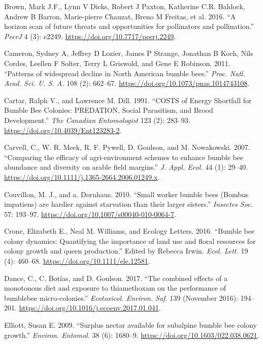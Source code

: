 \documentclass[11pt,]{article}
\begin{document}
\leavevmode\hypertarget{ref-Brown2016a}{}%
Brown, Mark J.F., Lynn V Dicks, Robert J Paxton, Katherine C.R. Baldock,
Andrew B Barron, Marie-pierre Chauzat, Breno M Freitas, et al. 2016. ``A
horizon scan of future threats and opportunities for pollinators and
pollination.'' \emph{PeerJ} 4 (3): e2249.
\url{https://doi.org/10.7717/peerj.2249}.

\leavevmode\hypertarget{ref-Cameron2011}{}%
Cameron, Sydney A, Jeffrey D Lozier, James P Strange, Jonathan B Koch,
Nils Cordes, Leellen F Solter, Terry L Griswold, and Gene E Robinson.
2011. ``Patterns of widespread decline in North American bumble bees.''
\emph{Proc. Natl. Acad. Sci. U. S. A.} 108 (2): 662--67.
\url{https://doi.org/10.1073/pnas.1014743108}.

\leavevmode\hypertarget{ref-Cartar1991}{}%
Cartar, Ralph V., and Lawrence M. Dill. 1991. ``COSTS of Energy
Shortfall for Bumble Bee Colonies: PREDATION, Social Parasitism, and
Brood Development.'' \emph{The Canadian Entomologist} 123 (2): 283--93.
\url{https://doi.org/10.4039/Ent123283-2}.

\leavevmode\hypertarget{ref-Carvell2007}{}%
Carvell, C., W. R. Meek, R. F. Pywell, D. Goulson, and M. Nowakowski.
2007. ``Comparing the efficacy of agri-environment schemes to enhance
bumble bee abundance and diversity on arable field margins.'' \emph{J.
Appl. Ecol.} 44 (1): 29--40.
\url{https://doi.org/10.1111/j.1365-2664.2006.01249.x}.

\leavevmode\hypertarget{ref-Couvillon2010}{}%
Couvillon, M. J., and a. Dornhaus. 2010. ``Small worker bumble bees
(Bombus impatiens) are hardier against starvation than their larger
sisters.'' \emph{Insectes Soc.} 57: 193--97.
\url{https://doi.org/10.1007/s00040-010-0064-7}.

\leavevmode\hypertarget{ref-Crone2016}{}%
Crone, Elizabeth E., Neal M. Williams, and Ecology Letters. 2016.
``Bumble bee colony dynamics: Quantifying the importance of land use and
floral resources for colony growth and queen production.'' Edited by
Rebecca Irwin. \emph{Ecol. Lett.} 19 (4): 460--68.
\url{https://doi.org/10.1111/ele.12581}.

\leavevmode\hypertarget{ref-Dance2017}{}%
Dance, C., C. Botías, and D. Goulson. 2017. ``The combined effects of a
monotonous diet and exposure to thiamethoxam on the performance of
bumblebee micro-colonies.'' \emph{Ecotoxicol. Environ. Saf.} 139
(November 2016): 194--201.
\url{https://doi.org/10.1016/j.ecoenv.2017.01.041}.

\leavevmode\hypertarget{ref-Elliott2009}{}%
Elliott, Susan E. 2009. ``Surplus nectar available for subalpine bumble
bee colony growth.'' \emph{Environ. Entomol.} 38 (6): 1680--9.
\url{https://doi.org/10.1603/022.038.0621}.
\end{document}
